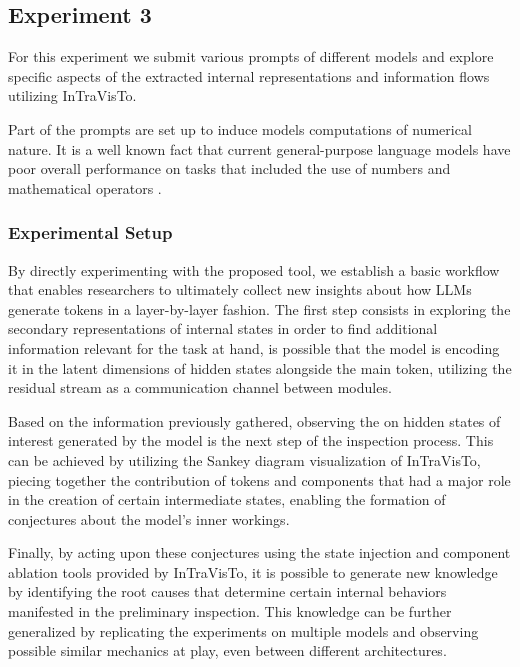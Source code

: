 
\subsection{Experiment 3}\label{sec:exp_intravisto_exp3}

For this experiment we submit various prompts  of different models and explore specific aspects of the extracted internal representations and information flows utilizing InTraVisTo.

Part of the prompts are set up to induce models  computations of numerical nature.
It is a well known fact that current general-purpose language models have  poor overall performance on tasks that included the use of numbers and mathematical operators .

\subsubsection{Experimental Setup}

By directly experimenting with the proposed tool, we establish a basic workflow that enables researchers to ultimately collect new insights about how LLMs generate tokens in a layer-by-layer fashion.
The first step consists in exploring the secondary representations of internal states in order to find additional information relevant for the task at hand,  is possible that the model is encoding it in the latent dimensions of hidden states alongside the main token, utilizing the residual stream as a communication channel between modules.

Based on the information previously gathered, observing the  on hidden states of interest generated by the model is the next step of the inspection process.
This can be achieved by utilizing the Sankey diagram visualization of InTraVisTo, piecing together the contribution of tokens and components that had a major role in the creation of certain intermediate states, enabling the formation of conjectures about the model's inner workings.

Finally, by acting upon these conjectures using the state injection and component ablation tools provided by InTraVisTo, it is possible to generate new knowledge by identifying the root causes that determine certain internal behaviors manifested in the preliminary inspection.
This knowledge can be further generalized by replicating the experiments on multiple models and observing possible similar mechanics at play, even between different architectures.

